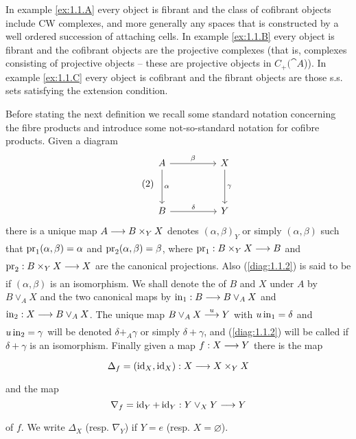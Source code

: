 \documentclass[../main]{subfiles}
\begin{document}
\begin{remark*}
In example \ref{ex:1.1.A} every object is fibrant and the class of cofibrant objects include CW complexes, and more generally any spaces that is constructed by a well ordered succession of attaching cells. In example \ref{ex:1.1.B} every object is fibrant and the cofibrant objects are the projective complexes (that is, complexes consisting of projective objects -- these are  projective objects in $C_+(\cat{A}$)). In example \ref{ex:1.1.C} every object is cofibrant and the fibrant objects are those s.s. sets satisfying the extension condition.

\end{remark*}	

Before stating the next definition we recall some standard notation concerning the fibre products and introduce some not-so-standard notation for cofibre products. Given a diagram
\[\tag{2}\label{diag:1.1.2}
	\begin{tikzcd}
		A\arrow[rr,"\beta"]\arrow[dd,"\alpha"]&& X\arrow[dd,"\gamma"]\\ \\ B\arrow[rr,"\delta"] &&Y
	\end{tikzcd}
\]
there is a unique map $A\varrightarrow{} B\times_YX$ denotes $(\alpha,\beta)_Y$ or simply $(\alpha,\beta)$ such that $\operatorname{pr}_1(\alpha,\beta)=\alpha$ and $\operatorname{pr}_2(\alpha,\beta)=\beta$, where $\pr_1:B\times_YX\varrightarrow{} B$ and $\pr_2:B\times_YX\varrightarrow{} X$ are the canonical projections. Also (\ref{diag:1.1.2}) is said to be  if $(\alpha,\beta)$ is an isomorphism. We shall denote the  of $B$ and $X$ under $A$ by $B\vee_A X$ and the two canonical maps by $\In_1:B\varrightarrow{} B\vee_AX$ and $\In_2:X\varrightarrow{} B\vee_AX$. The unique map $B\vee_AX \varrightarrow{u}Y$ with $u\operatorname{in}_1=\delta$ and $u\operatorname{in}_2=\gamma$ will be denoted $\delta+_A \gamma$ or simply $\delta+\gamma$, and (\ref{diag:1.1.2}) will be called  if $\delta+\gamma$ is an isomorphism. Finally given a map $f:X\varrightarrow{} Y$ there is the  map \[\Delta_f= (\id_X,\id_X):X\varrightarrow{} X\times_Y X\]
and the  map \[\nabla_f= \id_Y+\id_Y: Y\vee_XY\varrightarrow{}Y\] of $f$. We write $\Delta_X$ (resp. $\nabla_Y$) if $Y=e$ (resp. $X=\varnothing$).
\end{document}
